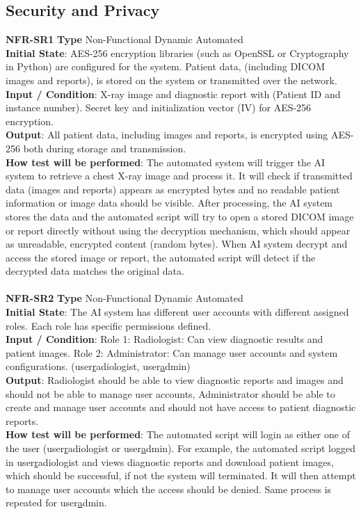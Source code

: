 \documentclass[12pt, titlepage]{article}
\begin{document}
\subsection{Security and Privacy}
\noindent \textbf{NFR-SR1} \textbf{Type} Non-Functional Dynamic Automated\\
         \indent \textbf{Initial State}: AES-256 encryption libraries (such as OpenSSL or Cryptography in Python) are configured for the system. Patient data, (including DICOM images and reports), is stored on the system or transmitted over the network.\\
         \indent \textbf{Input / Condition}:  X-ray image and diagnostic report with (Patient ID and instance number). Secret key and initialization vector (IV) for AES-256 encryption.\\
         \indent \textbf{Output}: All patient data, including images and reports, is encrypted using AES-256 both during storage and transmission.\\
         \indent \textbf{How test will be performed}: The automated system will trigger the AI system to retrieve a chest X-ray image and process it. It will check if transmitted data (images and reports) appears as encrypted bytes and no readable patient information or image data should be visible. After processing, the AI system stores the data and the automated script will try to open a stored DICOM image or report directly without using the decryption mechanism, which should appear as unreadable, encrypted content (random bytes). When AI system decrypt and access the stored image or report, the automated script will detect if the decrypted data matches the original data.\\
         \\
\textbf{NFR-SR2} \textbf{Type} Non-Functional Dynamic Automated\\
        \indent \textbf{Initial State}: The AI system has different user accounts with different assigned roles. Each role has specific permissions defined.\\
        \indent \textbf{Input / Condition}: Role 1: Radiologist: Can view diagnostic results and patient images. Role 2: Administrator: Can manage user accounts and system configurations. (user\underline radiologist, user\underline admin)\\
        \indent \textbf{Output}: Radiologist should be able to view diagnostic reports and images and should not be able to manage user accounts, Administrator should be able to create and manage user accounts and should not have access to patient diagnostic reports.\\
        \indent \textbf{How test will be performed}: The automated script will login as either one of the user (user\underline radiologist or user\underline admin). For example, the automated script logged in user\underline radiologist and views diagnostic reports and download patient images, which should be successful, if not the system will terminated. It will then attempt to manage user accounts which the access should be denied. Same process is repeated for  user\underline admin.\\
        \\
\end{document}
